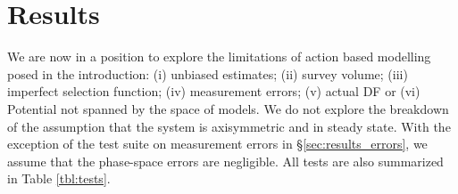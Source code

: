 \section{Results} \label{sec:results}

We are now in a position to explore the limitations of action based modelling posed in the introduction: (i) unbiased estimates; (ii) survey volume; (iii) imperfect selection function; (iv) measurement errors; (v) actual DF or (vi) Potential not spanned by the space of models. We do not explore the breakdown of the assumption that the system is axisymmetric and
in steady state. With the exception of the test suite on measurement errors in \S\ref{sec:results_errors}, we assume that the phase-space errors are negligible. All tests are also summarized in Table \ref{tbl:tests}. 



